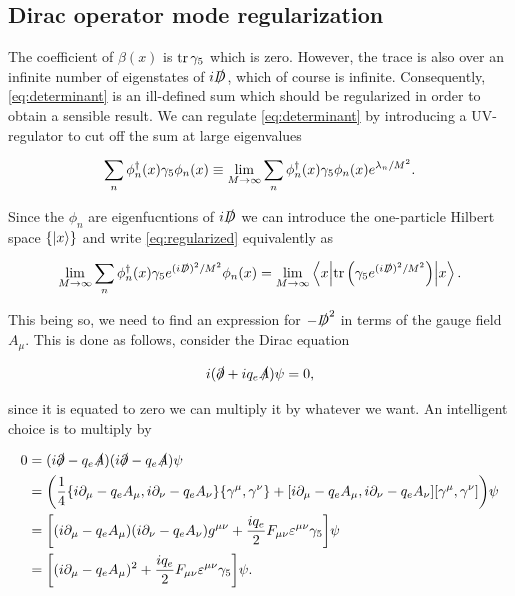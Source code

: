 \subsection{Dirac operator mode regularization}

The coefficient of $\beta(x)$ is $\tr\gamma_5$ which is zero. However, the trace is also over an infinite number of eigenstates of $i\slashed{D}$, which of course is infinite. Consequently, \eqref{eq:determinant} is an ill-defined sum which should be regularized in order to obtain a sensible result. We can regulate \eqref{eq:determinant} by introducing a UV-regulator to cut off the sum at large eigenvalues

\begin{equation}
    \sum_n \phi_n^\dagger(x) \gamma_5 \phi_n(x) \equiv \lim_{M\to\infty} \sum_n \phi_n^\dagger(x)\gamma_5 \phi_n(x)e^{\lambda_n/M^2}.
    \label{eq:regularized}
\end{equation}

Since the $\phi_n$ are eigenfucntions of $i\slashed{D}$ we can introduce the one-particle Hilbert space $\{\ket{x}\}$ and write \eqref{eq:regularized} equivalently as

\begin{equation}
    \lim_{M\to\infty} \sum_n \phi_n^\dagger(x)\gf e^{(i\slashed{D})^2/M^2}\phi_n(x)=\lim_{M\to\infty}
     \ev**{\tr\qty(\gf e^{(i\slashed{D})^2/M^2})}{x}.
\end{equation}

This being so, we need to find an expression for $-\slashed{D}^2$ in terms of the gauge field $A_\mu$. This is done as follows, consider the Dirac equation

\begin{equation}
    i(\slashed{\partial} + iq_e\slashed{A})\psi = 0,
\end{equation}

since it is equated to zero we can multiply it by whatever we want. An intelligent choice is to multiply by

\begin{align}
        0&=(i\slashed{\partial} - q_e\slashed{A})(i\slashed{\partial} - q_e\slashed{A})\psi\nonumber\\
        &= \qty(\frac{1}{4}\acomm{i\partial_\mu - q_eA_\mu}{i\partial_\nu - q_eA_\nu}\acomm{\gmu}{\gnu}+ \comm{i\partial_\mu - q_eA_\mu}{i\partial_\nu-q_eA_\nu}\comm{\gmu}{\gnu})\psi\nonumber\\
        &= \qty[ (i\partial_\mu - q_eA_\mu)(i\partial_\nu - q_eA_\nu) g^{\mu\nu} + \frac{iq_e}{2} F_{\mu\nu}\eumn\gf]\psi\nonumber\\
        &= \qty[(i\partial_\mu - q_eA_\mu)^2 +\frac{iq_e}{2} F_{\mu\nu}\eumn\gf]\psi.
        \label{eq:diracsq}
\end{align}

